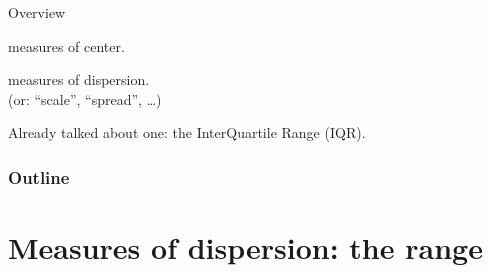 %
%
%



\subtitle{What is the scale of the data?}

\date{22 January 2015}




\begin{frame}
  \maketitle
\end{frame}




\begin{frame}{Overview}

    measures of center.

    \vspace{3em}
    
    measures of dispersion. \\
    (or: ``scale'', ``spread'', \ldots)

    \vspace{3em}
    
    Already talked about one: the InterQuartile Range (IQR).

\end{frame}


\begin{frame}\frametitle<presentation>{Outline}
  \tableofcontents
\end{frame}


\section{Measures of dispersion: the range}


